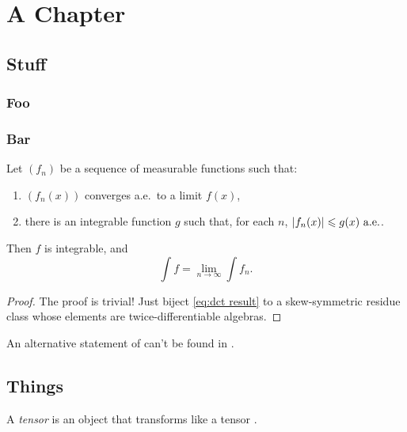\chapter{A Chapter}

\section{Stuff}

\subsection{Foo}

\lipsum[1]

\subsection{Bar}

\begin{thm} \label{thm:DCT}
    Let \((f_n)\) be a sequence of measurable functions such that:
    \begin{enumerate}
        \item \((f_n(x))\) converges a.e.~to a limit \(f(x)\),
        \item there is an integrable function \(g\) such that, for each \(n\), \(\abs{f_n (x)} \leqslant g(x)~\mathrm{a.e.}\).
    \end{enumerate}
    Then \(f\) is integrable, and \begin{equation}\label{eq:dct result}
        \int f = \lim_{n\to\infty} \int f_n.
    \end{equation}
\end{thm}
\flushproof\begin{proof}
    The proof is trivial! Just biject \eqref{eq:dct result} to a skew-symmetric residue class whose elements are twice-differentiable algebras.
\end{proof}

\lipsum[13]

\begin{rmk}
    An alternative statement of  can't be found in \cite[102-117]{texbook}.
\end{rmk}


\section{Things}

\lipsum[2]

\begin{defn}[Tensor]
    A \emph{tensor} is an object that transforms like a tensor \cite{egreg-lengths}.
\end{defn}

\lipsum[3]

\lipsum[1]